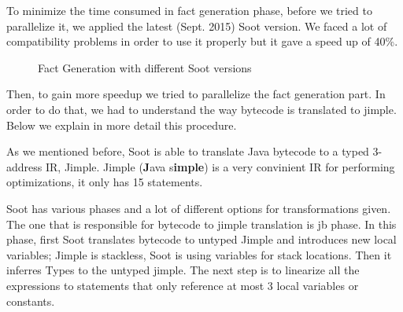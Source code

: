 \documentclass{dithesis}
\begin{document}
    	To minimize the time consumed in fact generation phase, before we tried to parallelize it, we applied the latest (Sept. 2015) Soot version. We faced a lot of compatibility problems in order to use it properly but it gave a speed up of 40\%.

		\begin{figure}[H]
			\centering
			\caption{Fact Generation with different Soot versions}
		\end{figure}

    	Then, to gain more speedup we tried to parallelize the fact generation part. In order to do that, we had to understand the way bytecode is translated to jimple. Below we explain in more detail this procedure. 

        As we mentioned before, Soot is able to translate Java bytecode to a typed 3-address IR, Jimple. Jimple (\textbf{J}ava s\textbf{imple}) is a very convinient IR for performing optimizations, it only has 15 statements.

        Soot has various phases and a lot of different options for transformations given. The one that is responsible for bytecode to jimple translation is jb phase. In this phase, first Soot translates bytecode to untyped Jimple and introduces new local variables; Jimple is stackless, Soot is using variables for stack locations. Then it inferres Types to the untyped jimple. The next step is to linearize all the expressions to statements that only reference at most 3 local variables or constants. 
\end{document}
